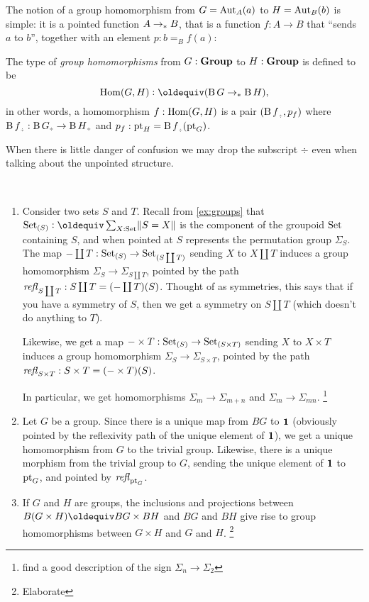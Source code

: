 The notion of a group homomorphism from $G=\mathrm{Aut}_A(a)$ to $H=\mathrm{Aut}_B(b)$
is simple: it is a pointed function $A\to_\ast B$, that is a function
$f:A\to B$ that ``sends $a$ to $b$'', \ie together with an element
$p:b=_Bf(a)$:
\begin{definition}\label{def:grouphomomorphism}
  The type of \emph{group homomorphisms} from $G:\mathbf{Group}$ to
  $H:\mathbf{Group}$ is defined to be
  $$\Hom(G,H)\defequi(\clf G\ptdto \clf H),
$$
in other words, a homomorphism $f:\mathrm{Hom}(G,H)$ is a pair $({\clf f}_\div,p_f)$ where ${\clf f}_\div:{\clf G}_\div\to {\clf H}_\div$ and $p_f:\pt_H={\clf f}_\div(\pt_G)$.
\end{definition}
When there is little danger of confusion we may drop the subscript
$\div$ even when talking about the unpointed structure.
\begin{example}%
  \label{ex:groups-morphisms}%
  ~%
  \begin{enumerate}
  \item Consider two sets $S$ and $T$.  Recall from \cref{ex:groups}
    that $\Set_{(S)}\defequi\sum_{X:\Set}\Trunc{S=X}$ is the component
    of the groupoid $\mathord{\mathrm{Set}}$ containing $S$, and when pointed at $S$
    represents the permutation group $\Sigma_S$.  The map
    ${-}\coprod T:\mathord{\mathrm{Set}}_{(S)}\to\mathord{\mathrm{Set}}_{(S\coprod T)}$ sending $X$ to $X\coprod T$
    induces a group homomorphism $\Sigma_S\to\Sigma_{S\coprod T}$,
    pointed by the path $\mathop{\mathit{refl}_{S\coprod T}}:S\coprod T = ({-}\coprod T)(S)$.
    Thought of as symmetries, this says that if you have a symmetry of
    $S$, then we get a symmetry on $S\coprod T$ (which doesn't do
    anything to $T$).

    Likewise, we get a map
    ${-}\times T:\mathord{\mathrm{Set}}_{(S)}\to\mathord{\mathrm{Set}}_{(S\times T)}$ sending $X$ to
    $X\times T$ induces a group homomorphism
    $\Sigma_S\to\Sigma_{S\times T}$, pointed by the path
    $\mathop{\mathit{refl}_{S\times T}}: {S\times T} = ({-} \times T)(S)$.

In particular, we get homomorphisms $\Sigma_m\to\Sigma_{m+n}$ and $\Sigma_m\to\Sigma_{mn}$. \footnote{find a good description of the sign $\Sigma_n\to\Sigma_2$}
\item Let $G$ be a group.  Since there is a unique map from $BG$ to
  $\mathbf{1} $ (obviously pointed by the reflexivity path of the unique
  element of $\mathbf{1}$), we get a unique homomorphism from $G$ to the
  trivial group.  Likewise, there is a unique morphism from the
  trivial group to $G$, sending the unique element of $\mathbf{1}$ to
  $\mathrm{pt}_G$, and pointed by $\mathop{\mathit{refl}_{\mathrm{pt}_G}}$.
\item If $G$ and $H$ are groups, the inclusions and projections between $B(G\times H)\oldequiv BG\times BH$ and $BG$ and $BH$ give rise to group homomorphisms between $G\times H$ and $G$ and $H$.  \footnote{Elaborate}
  \end{enumerate}
\end{example}

